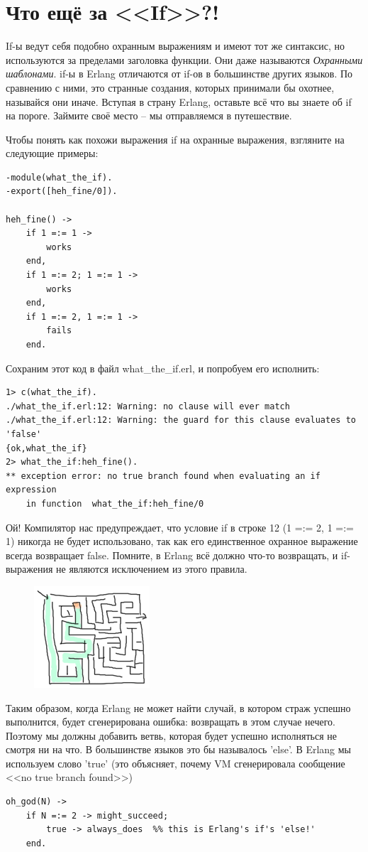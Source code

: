 \documentclass[a4paper,12pt]{report}
\newcommand{\ops}{\colorbox{lgreen}}
\begin{document}
\section{Что ещё за <<If>>?!}
\ops{If}\--ы ведут себя подобно охранным выражениям и имеют тот же синтаксис, но используются за пределами заголовка функции. Они даже называются \emph{Охранными шаблонами}. \ops{if}\--ы в Erlang отличаются от \ops{if}\--ов в большинстве других языков. По сравнению с ними, это странные создания, которых принимали бы охотнее, называйся они иначе. Вступая в страну Erlang, оставьте всё что вы знаете об \ops{if} на пороге. Займите своё место \--- мы отправляемся в путешествие.

Чтобы понять как похожи выражения \ops{if} на охранные выражения, взгляните на следующие примеры:
\begin{lstlisting}[style=erlang]
-module(what_the_if).
-export([heh_fine/0]).
 
heh_fine() ->
    if 1 =:= 1 ->
        works
    end,
    if 1 =:= 2; 1 =:= 1 ->
        works
    end,
    if 1 =:= 2, 1 =:= 1 ->
        fails
    end.
\end{lstlisting}
Сохраним этот код в файл \ops{what\_the\_if.erl}, и попробуем его исполнить:
\begin{lstlisting}[style=repl]
1> c(what_the_if).
./what_the_if.erl:12: Warning: no clause will ever match
./what_the_if.erl:12: Warning: the guard for this clause evaluates to 'false'
{ok,what_the_if}
2> what_the_if:heh_fine().
** exception error: no true branch found when evaluating an if expression
    in function  what_the_if:heh_fine/0
\end{lstlisting}
Ой! Компилятор нас предупреждает, что условие if в строке 12 (\ops{1 =:= 2, 1 =:= 1}) никогда не будет использовано, так как его единственное охранное выражение всегда возвращает \ops{false}. Помните, в Erlang всё должно что\--то возвращать, и \ops{if}\-- выражения не являются исключением из этого правила. 
\begin{figure}[h!]
    \includegraphics[width=0.3\linewidth]{labyrinth.png}
\end{figure}
Таким образом, когда Erlang не может найти случай, в котором страж успешно выполнится, будет сгенерирована ошибка: возвращать в этом случае нечего. Поэтому мы должны добавить ветвь, которая будет успешно исполняться не смотря ни на что. В большинстве языков это бы называлось 'else'. В Erlang мы используем слово 'true' (это объясняет, почему VM сгенерировала сообщение <<no true branch found>>)
\begin{lstlisting}[style=erlang]
oh_god(N) ->
    if N =:= 2 -> might_succeed;
        true -> always_does  %% this is Erlang's if's 'else!'
    end.
\end{lstlisting}
\end{document}
